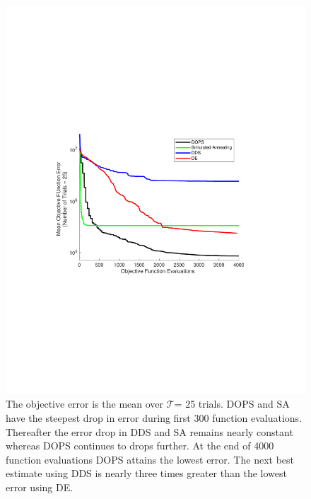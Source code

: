 \documentclass{bmcart}
\begin{document}
\begin{backmatter}
\begin{figure}[h!]
\centering
\includegraphics[trim = {3cm 8cm 3cm 7cm }, clip,width=1.0\textwidth]{./rachelfigs/RecreateFigure4.pdf}
\caption{ The objective error is the mean over $\mathcal{T}$= 25 trials.
DOPS and SA have the steepest drop in error during first 300 function evaluations. Thereafter the error drop in DDS and SA remains nearly constant whereas DOPS continues to drops further.
At the end of 4000 function evaluations DOPS attains the lowest error. The next best estimate using DDS is nearly three times greater than the lowest error using DE.
}\label{fig-convergence}
\end{figure}

\clearpage


\end{backmatter}
\end{document}

